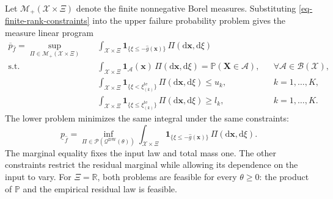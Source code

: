 \documentclass[review,11pt,3p,authoryear,nopreprintline]{elsarticle}
\begin{document}
Let $\mathcal M_+(\mathcal X\times\Xi)$ denote the finite nonnegative Borel measures. Substituting \eqref{eq-finite-rank-constraints} into the upper failure probability problem gives the measure linear program
\begin{equation}
  \begin{aligned}
    \overline p_{\hat f}
    =\sup_{\Pi\in\mathcal M_+(\mathcal X\times\Xi)}\quad&
      \int_{\mathcal X\times\Xi}
      \mathbf1_{\{\xi\le -\hat g(\bm x)\}}\,\Pi(\mathrm d\bm x,\mathrm d\xi)\\
    \text{s.t.}\quad&
      \int_{\mathcal X\times\Xi}
      \mathbf1_\mathcal{A}(\bm x)\,\Pi(\mathrm d\bm x,\mathrm d\xi)
      =\mathbb P(\bm{X} \in \mathcal{A}),
      &&\forall \mathcal{A}\in\mathcal B(\mathcal X),\\
    &\int_{\mathcal X\times\Xi}
      \mathbf1_{\{\xi<\xi_{(k)}^{\mathrm{te}}\}}\,\Pi(\mathrm d\bm x,\mathrm d\xi)\le u_k,
      &&k=1,\ldots,K,\\
    &\int_{\mathcal X\times\Xi}
      \mathbf1_{\{\xi\le \xi_{(k)}^{\mathrm{te}}\}}\,\Pi(\mathrm d\bm x,\mathrm d\xi)\ge l_k,
      &&k=1,\ldots,K.
  \end{aligned}
  \label{eq-measure-upper}
\end{equation}
The lower problem minimizes the same integral under the same constraints:
\begin{equation}
  \underline p_{\hat f}
  =\inf_{\Pi\in\mathscr P(\mathscr Q^{\mathrm{DW}}(\theta))}
    \int_{\mathcal X\times\Xi}
    \mathbf1_{\{\xi\le -\hat g(\bm x)\}}\,\Pi(\mathrm d\bm x,\mathrm d\xi).
  \label{eq-measure-lower}
\end{equation}
The marginal equality fixes the input law and total mass one. The other constraints restrict the residual marginal while allowing its dependence on the input to vary. For $\Xi=\mathbb R$, both problems are feasible for every $\theta\ge0$: the product of $\mathbb P$ and the empirical residual law is feasible.
\end{document}
